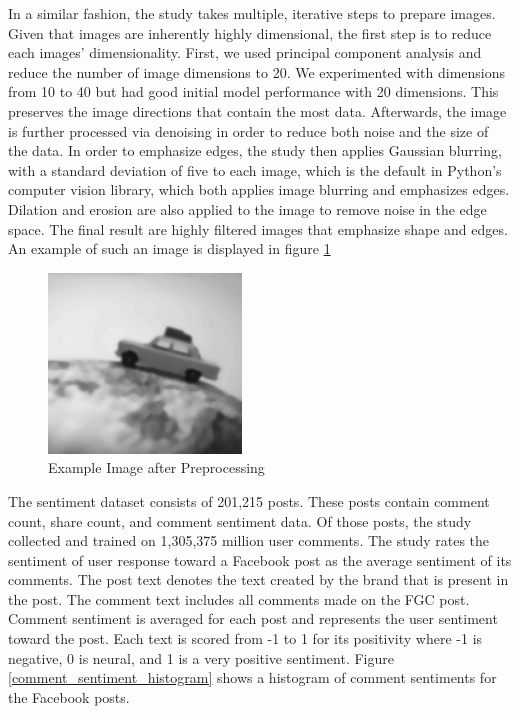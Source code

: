 \documentclass[mksc,blindrev]{informs3} %
\begin{document}
In a similar fashion, the study takes multiple, iterative steps to prepare images. Given that images are inherently highly dimensional, the first step is to reduce each images’ dimensionality. First, we used principal component analysis and reduce the number of image dimensions to 20.  We experimented with dimensions from 10 to 40 but had good initial model performance with 20 dimensions. This preserves the image directions that contain the most data. Afterwards, the image is further processed via denoising in order to reduce both noise and the size of the data. In order to emphasize edges, the study then applies Gaussian blurring, with a standard deviation of five to each image, which is the default in Python's computer vision library, which both applies image blurring and emphasizes edges. Dilation and erosion are also applied to the image to remove noise in the edge space. The final result are highly filtered images that emphasize shape and edges. An example of such an image is displayed in figure \ref{processed_image}

\begin{figure}
\centering
\includegraphics[width=\columnwidth]{images/preprocessed_image.png}
\caption{Example Image after Preprocessing}
\label{processed_image}
\end{figure}

The sentiment dataset consists of 201,215 posts. These posts contain comment count, share count, and comment sentiment data. Of those posts, the study collected and trained on 1,305,375 million user comments.  The study rates the sentiment of user response toward a Facebook post as the average sentiment of its comments. The post text denotes the text created by the brand that is present in the post. The comment text includes all  comments made on the FGC post. Comment sentiment is averaged for each post and represents the user sentiment toward the post. Each text is scored from -1 to 1 for its positivity where -1 is negative, 0 is neural, and 1 is a very positive sentiment. Figure \ref{comment_sentiment_histogram} shows a histogram of comment sentiments for the Facebook posts. 
\end{document}
